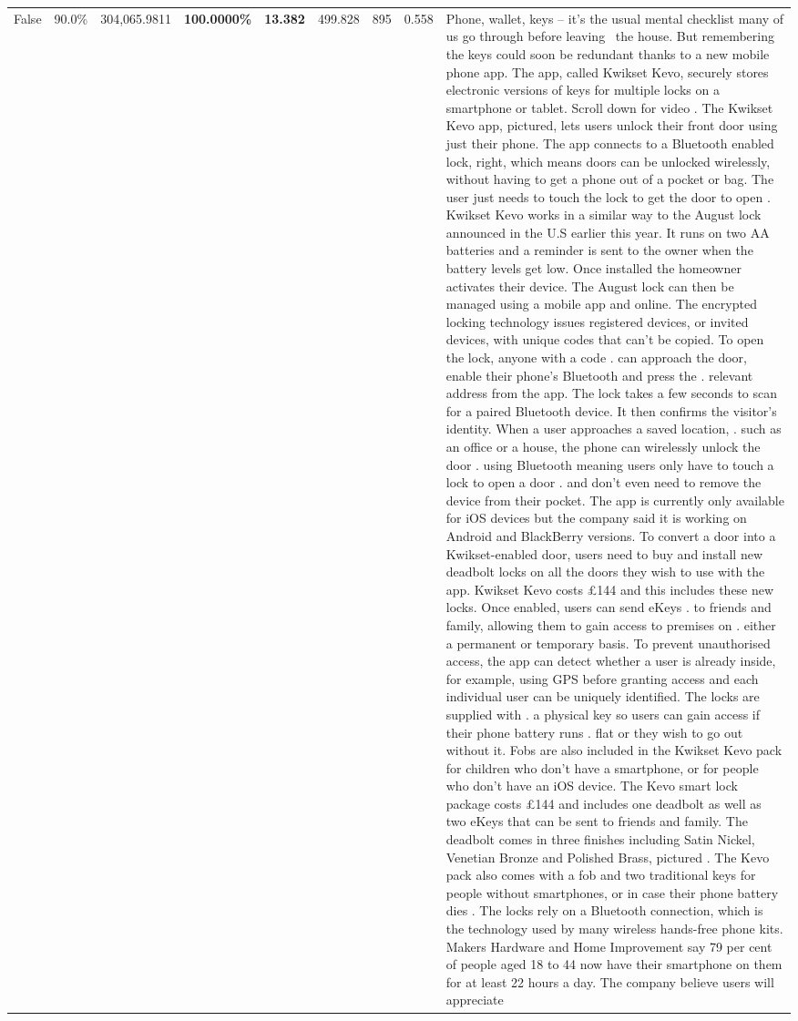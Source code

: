 \begin{table}[H]
\begin{tabular}{lllrlllll}
False & 90.0\% & \color{red} 304,065.9811 & \bfseries \color{red} 100.0000\% & \bfseries \color{red} 13.382 & 499.828 & 895 & 0.558 & Phone, wallet, keys – it’s the usual mental checklist many of us go through before leaving  the house. But remembering the keys could soon be redundant thanks to a new mobile phone app. The app, called Kwikset Kevo, securely stores electronic versions of keys for multiple locks on a smartphone or tablet. Scroll down for video . The Kwikset Kevo app, pictured, lets users unlock their front door using just their phone. The app connects to a Bluetooth enabled lock, right, which means doors can be unlocked wirelessly, without having to get a phone out of a pocket or bag. The user just needs to touch the lock to get the door to open . Kwikset Kevo works in a similar way to the August lock announced in the U.S earlier this year. It runs on two AA batteries and a reminder is sent to the owner when the battery levels get low. Once installed the homeowner activates their device. The August lock can then be managed using a mobile app and online. The encrypted locking technology issues registered devices, or invited devices, with unique codes that can't be copied. To open the lock, anyone with a code . can approach the door, enable their phone's Bluetooth and press the . relevant address from the app. The lock takes a few seconds to scan for a paired Bluetooth device. It then confirms the visitor's identity. When a user approaches a saved location, . such as an office or a house, the phone can wirelessly unlock the door . using Bluetooth meaning users only have to touch a lock to open a door . and don't even need to remove the device from their pocket. The app is currently only available for iOS devices but the company said it is working on Android and BlackBerry versions. To convert a door into a Kwikset-enabled door, users need to buy and install new deadbolt locks on all the doors they wish to use with the app. Kwikset Kevo costs £144 and this includes these new locks. Once enabled, users can send eKeys . to friends and family, allowing them to gain access to premises on . either a permanent or temporary basis. To prevent unauthorised access, the app can detect whether a user is already inside, for example, using GPS before granting access and each individual user can be uniquely identified. The locks are supplied with . a physical key so users can gain access if their phone battery runs . flat or they wish to go out without it. Fobs are also included in the Kwikset Kevo pack for children who don't have a smartphone, or for people who don't have an iOS device. The Kevo smart lock package costs £144 and includes one deadbolt as well as two eKeys that can be sent to friends and family. The deadbolt comes in three finishes including Satin Nickel, Venetian Bronze and Polished Brass, pictured . The Kevo pack also comes with a fob and two traditional keys for people without smartphones, or in case their phone battery dies . The locks rely on a Bluetooth connection, which is the technology used by many wireless hands-free phone kits. Makers Hardware and Home Improvement say 79 per cent of people aged 18 to 44 now have their smartphone on them for at least 22 hours a day. The company believe users will appreciate 
\end{tabular}
\end{table}
